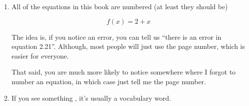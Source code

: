 \begin{enumerate}
  \item All of the equations in this book are numbered (at least they should be)

    \begin{equation}
        \label{eq:example}
        f(x) = 2 + x 
    \end{equation}

    The idea is, if you notice an error, you can tell us ``there is an error in
    equation 2.21''. Although, most people will just use the page number, which
    is easier for everyone.

    That said, you are much more likely to notice somewhere where I forgot to
    number an equation, in which case just tell me the page number.

    \label{conventions}
  \item If you see something , it's usually a vocabulary word.
\end{enumerate}
